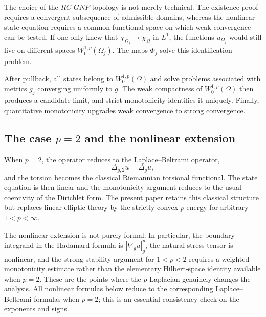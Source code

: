 \documentclass{article}
\begin{document}
The choice of the $RC$-$GNP$ topology is not merely technical. The
existence proof requires a convergent subsequence of admissible domains,
whereas the nonlinear state equation requires a common functional space
on which weak convergence can be tested. If one only knew that
$\chi_{\Omega_j}\to\chi_\Omega$ in $L^1$, the functions
$u_{\Omega_j}$ would still live on different spaces
$W_0^{1,p}(\Omega_j)$. The maps $\Phi_j$ solve this identification
problem.

After pullback, all states belong to $W_0^{1,p}(\Omega)$ and solve
problems associated with metrics $g_j$ converging uniformly to $g$.
The weak compactness of $W_0^{1,p}(\Omega)$ then produces a candidate
limit, and strict monotonicity identifies it uniquely. Finally,
quantitative monotonicity upgrades weak convergence to strong
convergence. %

\subsection{The case $p=2$ and the nonlinear extension}

When $p=2$, the operator reduces to the Laplace--Beltrami operator,
\[
\Delta_{g,2}u=\Delta_gu,
\]
and the torsion becomes the classical Riemannian torsional functional.
The state equation is then linear and the monotonicity argument reduces
to the usual coercivity of the Dirichlet form. The present paper retains
this classical structure but replaces linear elliptic theory by the
strictly convex $p$-energy for arbitrary $1<p<\infty$.

The nonlinear extension is not purely formal. In particular, the
boundary integrand in the Hadamard formula is
$|\nabla_g u|_g^p$, the natural stress tensor is nonlinear, and the
strong stability argument for $1<p<2$ requires a weighted monotonicity
estimate rather than the elementary Hilbert-space identity available
when $p=2$. These are the points where the $p$-Laplacian genuinely
changes the analysis.
All nonlinear formulas below reduce to the corresponding
Laplace--Beltrami formulas when $p=2$; this is an essential consistency
check on the exponents and signs.

\end{document}
